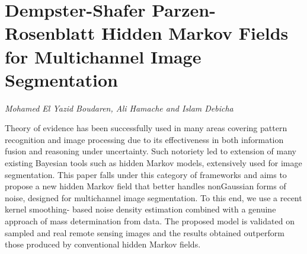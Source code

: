 \documentclass[../booklet.tex]{subfiles}
\begin{document}
\section[Dempster-Shafer Parzen-Rosenblatt Hidden Markov Fields for Multichannel Image Segmentation. {\it Mohamed El Yazid Boudaren, Ali Hamache and Islam Debicha}]{Dempster-Shafer Parzen-Rosenblatt Hidden Markov Fields for Multichannel Image Segmentation}
  

\begin{center}
  {\it Mohamed El Yazid Boudaren, Ali Hamache and Islam Debicha}
\end{center}

\vskip 0.8cm


Theory of evidence has been successfully used in many areas covering pattern recognition and image processing due to its effectiveness in both information fusion and reasoning under uncertainty. Such notoriety led to extension of many existing Bayesian tools such as hidden Markov models, extensively used for image segmentation.
This paper falls under this category of frameworks and aims to propose a new hidden Markov field that better handles nonGaussian forms of noise, designed for multichannel image segmentation. To this end, we use a recent kernel smoothing- based noise density estimation combined with a genuine approach of mass determination from data. The proposed model is validated on sampled and real remote sensing images and the results obtained outperform those produced by conventional hidden Markov fields.
\end{document}

